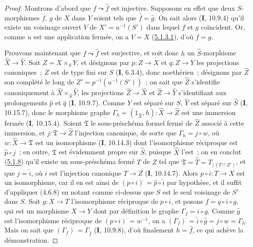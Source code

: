 \begin{proof}
Montrons d'abord que $f\leadsto\widehat f$ est injective. Supposons en effet que deux
$S$-morphismes $f$, $g$ de $X$ dans $Y$ soient tels que $\widehat f=\widehat g$.
On sait alors (\textbf{I}, 10.9.4) qu'il existe un voisinage ouvert $V$ de
$X'=u^{-1}(S')$ dans lequel $f$ et $g$ coïncident. Or, comme $u$ est une application
fermée, on a $V=X$ (\hyperref[III.5.1.3.1-fr]{5.1.3.1}), d'où $f=g$.

Prouvons maintenant que $f\leadsto\widehat f$ est surjective, et soit donc $h$ un
$\widehat S$-morphisme $\widehat X\to\widehat Y$. Soit $Z=X\times_S Y$, et
désignons par $p:Z\to X$ et $q:Z\to Y$ les projections canoniques~; $Z$ est de
type fini sur $S$ (\textbf{I}, 6.3.4), donc noethérien~; désignons par $\widehat Z$ son
complété le long de $Z'=p^{-1}(u^{-1}(S'))$~; on sait que $\widehat Z$ s'identifie
canoniquement à $\widehat X\times_{\widehat S}\widehat Y$, les projections
$\widehat Z\to\widehat X$ et $\widehat Z\to\widehat Y$ s'identifiant aux
prolongements $\widehat p$ et $\widehat q$ (\textbf{I}, 10.9.7). Comme $Y$ est séparé sur
$S$, $\widehat Y$ est séparé sur $\widehat S$ (\textbf{I}, 10.15.7), donc le morphisme
graphe
$\Gamma_h=(1_{\widehat X},h):\widehat X\to\widehat Z$
est une immersion fermée (\textbf{I}, 10.15.4). Soient $\mathfrak T$ le sous-préschéma
formel fermé de $\widehat Z$ associé à cette immersion, et
$j:\mathfrak T\to\widehat Z$ l'injection canonique, de sorte que
$\Gamma_h=j\circ w$, où $w:\widehat X\to\mathfrak T$ est un isomorphisme
(\textbf{I}, 10.14.3) dont l'isomorphisme réciproque est $\widehat p\circ j$~; en outre,
$\mathfrak T$ est évidemment propre sur $\widehat S$, puisque $\widehat X$ l'est~;
on en conclut (\hyperref[III.5.1.8-fr]{5.1.8}) qu'il existe un sous-préschéma
fermé $T$ de $Z$ tel que
$\mathfrak T=\widehat T=T_{/(T\cap Z')}$, et que $j=\widehat i$, où $i$ est
l'injection canonique $T\to Z$ (\textbf{I}, 10.14.7). Alors $p\circ i:T\to X$ est un
isomorphisme, car il en est ainsi de
$(p\circ i)^{\widehat{\,}}=\widehat p\circ\widehat i$ par hypothèse, et il suffit
d'appliquer
(4.6.8) en notant comme ci-dessus que $S$ est le seul voisinage de $S'$ dans $S$.
Soit $g:X\to T$ l'isomorphisme réciproque de $p\circ i$, et posons
$f=q\circ i\circ g$, qui est un morphisme $X\to Y$ dont par définition le graphe
$\Gamma_f=i\circ g$. Comme $\widehat g$ est l'isomorphisme réciproque de
$(p\circ i)^{\widehat{\,}}=w^{-1}$, on a
$(\Gamma_f)^{\widehat{\,}}=\widehat i\circ\widehat g=j\circ w=\Gamma_h$.
Mais on sait que $(\Gamma_f)^{\widehat{\,}}=\Gamma_{\widehat f}$ (\textbf{I}, 10.9.8), d'où
finalement $h=\widehat f$, ce qui achève la démonstration.
\end{proof}

